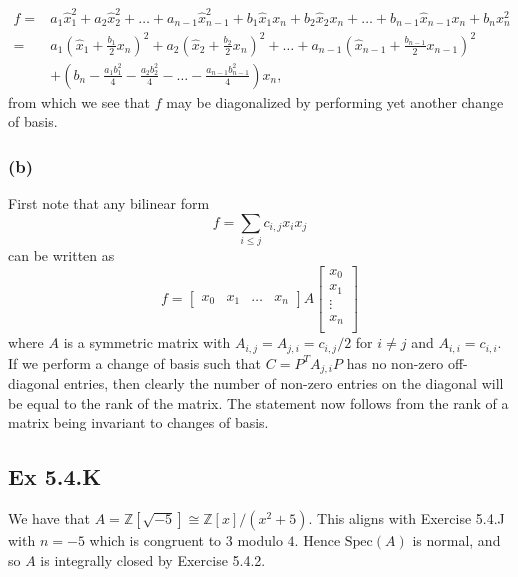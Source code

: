 \documentclass{article}
\theoremstyle{definition}
\newcommand{\Z}{\mathbb{Z}}
\newcommand{\Spec}{\text{Spec}}
\begin{document}
\begin{align*}
	f
	=&
	a_1 \hat{x}_1^{2}
	+
	a_2 \hat{x}_2^{2}
	+
	\ldots
	+
	a_{n - 1} \hat{x}_{n - 1}^{2}
	+
	b_1 \hat{x}_1 x_{n}
	+
	b_2 \hat{x}_2 x_n
	+
	\ldots
	+
	b_{n - 1} \hat{x}_{n - 1} x_n
	+
	b_{n} x_n^{2} \\
	=&
	a_1 \left(\hat{x}_1 + \frac{b_1}{2} x_n\right)^{2}
	+
	a_2 \left(\hat{x}_2 + \frac{b_2}{2} x_n\right)^{2}
	+
	\ldots
	+
	a_{n - 1} \left(\hat{x}_{n - 1} + \frac{b_{n-1}}{2} x_{n-1}\right)^{2} \\
	 &+
	\left(
		b_n
		-
		\frac{a_1 b_1^2}{4}
		-
		\frac{a_2 b_2^2}{4}
		-
		\ldots
		-
		\frac{a_{n-1} b_{n - 1}^2}{4}
	\right)
	x_n,
\end{align*} 
from which we see that $f$ may be diagonalized by performing 
yet another change of basis.

\subsubsection*{(b)}

First note that any bilinear form
\[
	f = \sum_{i \leq j} c_{i, j} x_i x_j
\]
can be written as 
\[
	f 
	=
	\begin{bmatrix}
		x_0 & x_1 & \ldots & x_n 
	\end{bmatrix}
	A
	\begin{bmatrix}
		x_0 \\
		x_1 \\
		\vdots \\
		x_n \\
	\end{bmatrix}
\] 
where $A$ is a symmetric matrix with $A_{i,j} = A_{j, i} = c_{i,j}/2$ for $i
\not = j$ and $A_{i, i} = c_{i, i}$. If we perform a change of basis such that
$C = P^{T} A_{j, i} P$ has no non-zero off-diagonal entries, then clearly the
number of non-zero entries on the diagonal will be equal to the rank of the
matrix. The statement now follows from the rank of a matrix being invariant to
changes of basis.

\subsection*{Ex 5.4.K}

We have that $A = \Z[\sqrt{-5}] \cong \Z[x]/(x^2 + 5)$. This aligns with Exercise
5.4.J with $n = -5$ which is congruent to $3$ modulo $4$. Hence $\Spec(A)$
is normal, and so $A$ is integrally closed by Exercise 5.4.2. \\
\end{document}
